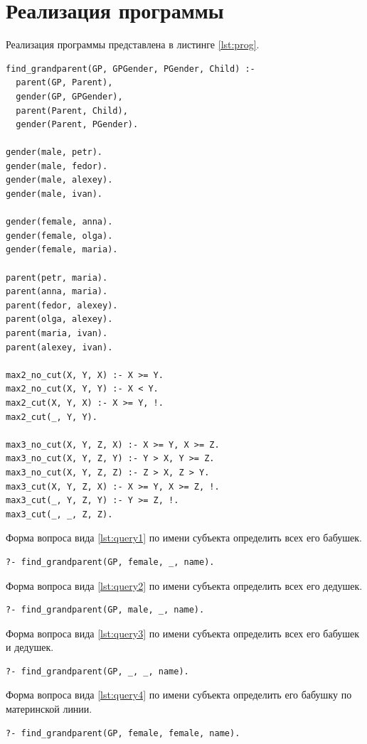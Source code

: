 \section{Реализация программы}

Реализация программы представлена в листинге \ref{lst:prog}.

\begin{lstlisting}[caption={Реализация программы <<Предки>>}, label={lst:prog}]
find_grandparent(GP, GPGender, PGender, Child) :-
  parent(GP, Parent),
  gender(GP, GPGender),
  parent(Parent, Child),
  gender(Parent, PGender).

gender(male, petr).
gender(male, fedor).
gender(male, alexey).
gender(male, ivan).

gender(female, anna).
gender(female, olga).
gender(female, maria).

parent(petr, maria).
parent(anna, maria).
parent(fedor, alexey).
parent(olga, alexey).
parent(maria, ivan).
parent(alexey, ivan).

max2_no_cut(X, Y, X) :- X >= Y.
max2_no_cut(X, Y, Y) :- X < Y.
max2_cut(X, Y, X) :- X >= Y, !.
max2_cut(_, Y, Y).

max3_no_cut(X, Y, Z, X) :- X >= Y, X >= Z.
max3_no_cut(X, Y, Z, Y) :- Y > X, Y >= Z.
max3_no_cut(X, Y, Z, Z) :- Z > X, Z > Y.
max3_cut(X, Y, Z, X) :- X >= Y, X >= Z, !.
max3_cut(_, Y, Z, Y) :- Y >= Z, !.
max3_cut(_, _, Z, Z).
\end{lstlisting}

Форма вопроса вида \ref{lst:query1} по имени субъекта определить всех его бабушек.
\begin{lstlisting}[caption={Форма задания вопроса 1}, label={lst:query1}]
?- find_grandparent(GP, female, _, name).
\end{lstlisting}

Форма вопроса вида \ref{lst:query2} по имени субъекта определить всех его дедушек.
\begin{lstlisting}[caption={Форма задания вопроса 2}, label={lst:query2}]
?- find_grandparent(GP, male, _, name).
\end{lstlisting}

Форма вопроса вида \ref{lst:query3} по имени субъекта определить всех его бабушек и дедушек.
\begin{lstlisting}[caption={Форма задания вопроса 3}, label={lst:query3}]
?- find_grandparent(GP, _, _, name).
\end{lstlisting}

Форма вопроса вида \ref{lst:query4} по имени субъекта определить его бабушку по материнской линии.
\begin{lstlisting}[caption={Форма задания вопроса 4}, label={lst:query4}]
?- find_grandparent(GP, female, female, name).
\end{lstlisting}

